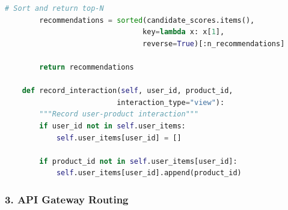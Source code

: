 \documentclass[12pt,a4paper]{article}
\begin{document}
\begin{lstlisting}[language=Python, caption=Collaborative Filtering (recommender-ai-service/app.py)]
        # Sort and return top-N
        recommendations = sorted(candidate_scores.items(),
                                key=lambda x: x[1], 
                                reverse=True)[:n_recommendations]
        
        return recommendations
    
    def record_interaction(self, user_id, product_id, 
                          interaction_type="view"):
        """Record user-product interaction"""
        if user_id not in self.user_items:
            self.user_items[user_id] = []
        
        if product_id not in self.user_items[user_id]:
            self.user_items[user_id].append(product_id)
\end{lstlisting}

\subsubsection{3. API Gateway Routing}
\end{document}
